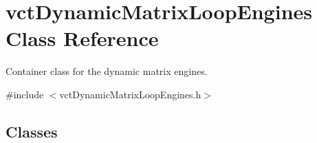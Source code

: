 \hypertarget{classvct_dynamic_matrix_loop_engines}{\section{vct\-Dynamic\-Matrix\-Loop\-Engines Class Reference}
\label{classvct_dynamic_matrix_loop_engines}
}


Container class for the dynamic matrix engines.  




{\ttfamily \#include $<$vct\-Dynamic\-Matrix\-Loop\-Engines.\-h$>$}

\subsection*{Classes}
